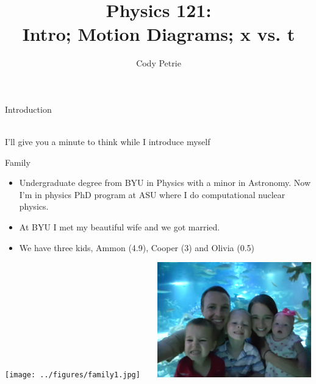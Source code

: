 \documentclass{beamer}
\title[{\color{white}{Chapters 1.1-3}}]{Physics 121: \\ Intro; Motion Diagrams; x vs. t}
\author{Cody Petrie}
\institute{Mesa Community College}
\date{}
\begin{document}
\begin{frame}
   \titlepage
\end{frame}



\iffalse
\begin{frame}{Introduction}
\begin{center}
   \\ I'll give you a minute to think while I introduce myself
\end{center}
\end{frame}

\begin{frame}{Family}
   \begin{itemize}
      \item Undergraduate degree from BYU in Physics with a minor in Astronomy. Now I'm in physics PhD program at ASU where I do computational nuclear physics.      \item At BYU I met my beautiful wife and we got married. 
      \item We have three kids, Ammon (4.9), Cooper (3) and Olivia (0.5)
   \end{itemize}
   \begin{center}
      \texttt{[image: ../figures/family1.jpg]}
      ~ ~
      \includegraphics[width=0.5\textwidth]{../figures/family2.jpg}
   \end{center}
\end{frame}
\end{document}

